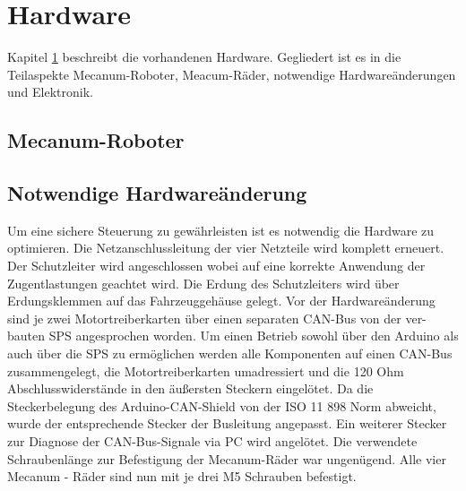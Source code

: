 
\section{Hardware}
\label{sec:Hardware}

Kapitel \ref{sec:Hardware} beschreibt die vorhandenen Hardware. Gegliedert ist es in die Teilaspekte Mecanum-Roboter, Meacum-Räder, notwendige Hardwareänderungen und Elektronik.
\subsection{Mecanum-Roboter}
\label{sec:Mecanum-Roboter}



\subsection{Notwendige Hardwareänderung}
Um eine sichere Steuerung zu gewährleisten ist es notwendig die Hardware zu optimieren.
Die Netzanschlussleitung der vier Netzteile wird komplett erneuert. Der Schutzleiter wird angeschlossen wobei auf eine korrekte Anwendung der Zugentlastungen geachtet wird. Die Erdung des Schutzleiters wird über Erdungsklemmen auf das Fahrzeuggehäuse gelegt.
Vor der Hardwareänderung sind je zwei Motortreiberkarten über einen separaten CAN-Bus von der ver-bauten SPS angesprochen worden. Um einen Betrieb sowohl über den Arduino als auch über die SPS zu ermöglichen werden alle Komponenten auf einen CAN-Bus zusammengelegt, die Motortreiberkarten umadressiert und die 120 Ohm Abschlusswiderstände in den äußersten Steckern eingelötet.
Da die Steckerbelegung des Arduino-CAN-Shield von der ISO 11 898 Norm abweicht, wurde der entsprechende Stecker der Busleitung angepasst. Ein weiterer Stecker zur Diagnose der CAN-Bus-Signale via PC wird angelötet.
Die verwendete Schraubenlänge zur Befestigung der Mecanum-Räder war ungenügend. Alle vier Mecanum - Räder sind nun mit je drei M5 Schrauben befestigt.
